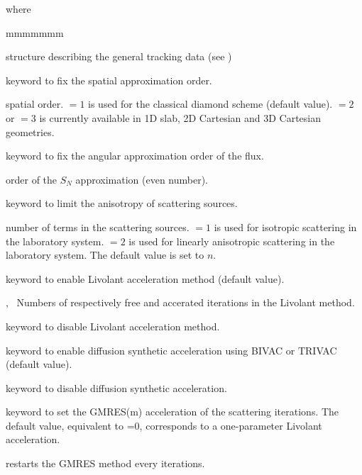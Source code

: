 \noindent where

\begin{ListeDeDescription}{mmmmmmm}

\item[\dstr{desctrack}] structure describing the general tracking data (see
)

\item[\moc{DIAM}] keyword to fix the spatial approximation order.

\item[\dusa{m}] spatial order.  $=1$ is used for the classical diamond scheme (default value).  $=2$
or $=3$ is currently available in 1D slab, 2D Cartesian and 3D Cartesian geometries.

\item[\moc{SN}] keyword to fix the angular approximation order of the flux.

\item[\dusa{n}] order of the $S_N$ approximation (even number).

\item[\moc{SCAT}] keyword to limit the anisotropy of scattering sources.

\item[\dusa{iscat}] number of terms in the scattering sources.  $=1$ is used for
isotropic scattering in the laboratory system.  $=2$ is used for
linearly anisotropic scattering in the laboratory system. The default value is set to $n$.

\item[\moc{LIVO}] keyword to enable Livolant acceleration method (default value).
\item[\dusa{icl1},~\dusa{icl2}] Numbers of respectively free and accerated iterations in the Livolant method.
\item[\moc{NLIVO}] keyword to disable Livolant acceleration method.
\item[\moc{DSA}] keyword to enable diffusion synthetic acceleration using BIVAC or TRIVAC (default value).

\item[\moc{NDSA}] keyword to disable diffusion synthetic acceleration.

\item[\moc{GMRES}] keyword to set the GMRES(m) acceleration of the scattering iterations. The default value,
equivalent to =0, corresponds to a one-parameter Livolant acceleration.\cite{gmres}

\item[\dusa{nstart}] restarts the GMRES method every  iterations.


\end{ListeDeDescription}
